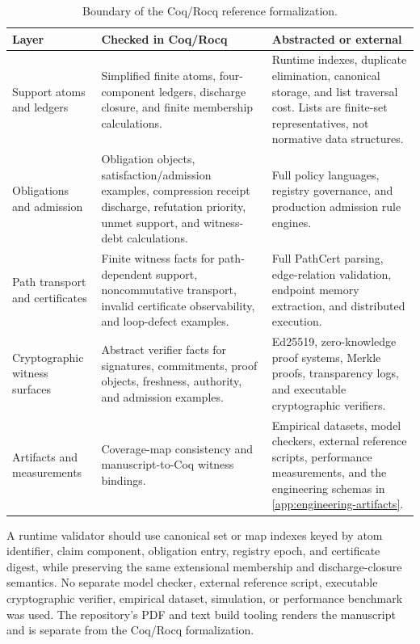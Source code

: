 \documentclass[11pt,twoside]{article}
\newcommand{\OGSchemaTableFont}{\footnotesize}
\newcommand{\OGTableHeaderRow}{\rowcolor{tableheaderbg}}
\newcommand{\TableHeaderRow}{\OGTableHeaderRow}
\newcommand{\OGAltRow}{\rowcolor{tablerowbg}}
\newenvironment{OGTable}[2][ht]{%
  \begin{table}[#1]
  \centering
  #2
  \renewcommand{\arraystretch}{1.08}%
  \rowcolors{2}{tablerowbg}{white}%
}{%
  \rowcolors{2}{}{}%
  \end{table}%
}
\theoremstyle{definition}
\begin{document}
\begin{OGTable}{\OGSchemaTableFont}
\begin{tabularx}{\textwidth}{>{\raggedright\arraybackslash}p{}>{\raggedright\arraybackslash}p{}>{\raggedright\arraybackslash}X}
\toprule
\TableHeaderRow \textbf{Layer} & \textbf{Checked in Coq/Rocq} & \textbf{Abstracted or external} \\
\midrule
Support atoms and ledgers & Simplified finite atoms, four-component ledgers, discharge closure, and finite membership calculations. & Runtime indexes, duplicate elimination, canonical storage, and list traversal cost. Lists are finite-set representatives, not normative data structures. \\
\OGAltRow
Obligations and admission & Obligation objects, satisfaction/admission examples, compression receipt discharge, refutation priority, unmet support, and witness-debt calculations. & Full policy languages, registry governance, and production admission rule engines. \\
Path transport and certificates & Finite witness facts for path-dependent support, noncommutative transport, invalid certificate observability, and loop-defect examples. & Full PathCert parsing, edge-relation validation, endpoint memory extraction, and distributed execution. \\
\OGAltRow
Cryptographic witness surfaces & Abstract verifier facts for signatures, commitments, proof objects, freshness, authority, and admission examples. & Ed25519, zero-knowledge proof systems, Merkle proofs, transparency logs, and executable cryptographic verifiers. \\
Artifacts and measurements & Coverage-map consistency and manuscript-to-Coq witness bindings. & Empirical datasets, model checkers, external reference scripts, performance measurements, and the engineering schemas in \cref{app:engineering-artifacts}. \\
\bottomrule
\end{tabularx}
\caption{Boundary of the Coq/Rocq reference formalization.}
\label{tab:formalization-boundary}
\end{OGTable}
\FloatBarrier

A runtime validator should use canonical set or map indexes keyed by atom
identifier, claim component, obligation entry, registry epoch, and certificate
digest, while preserving the same extensional membership and discharge-closure
semantics. No separate model checker, external reference script, executable
cryptographic verifier, empirical dataset, simulation, or performance benchmark
was used. The repository's PDF and text build tooling renders the manuscript and
is separate from the Coq/Rocq formalization.
\end{document}

